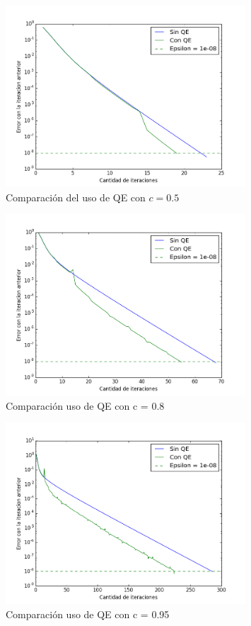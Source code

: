 \begin{figure}[H]
  \centering
    \includegraphics[width=0.8\textwidth]{comparando5.png}
    \caption{Comparaci\'on del uso de QE con $c = 0.5$}
    \label{}
\end{figure}

\begin{figure}[H]
  \centering
    \includegraphics[width=0.8\textwidth]{comparando8.png}
    \caption{Comparaci\'on uso de QE con c = 0.8}
    \label{}
\end{figure}

\begin{figure}[H]
  \centering
    \includegraphics[width=0.8\textwidth]{comparando95.png}
    \caption{Comparaci\'on uso de QE con c = 0.95}
    \label{}
\end{figure}

